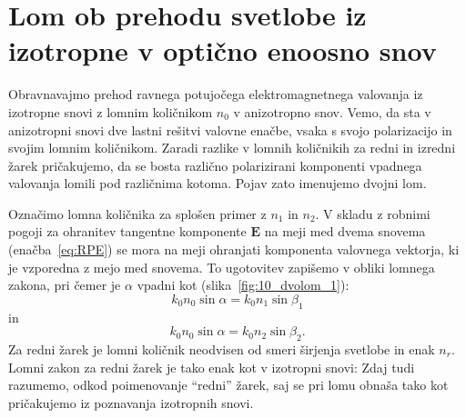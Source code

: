 \section{Lom ob prehodu svetlobe iz izotropne v optično enoosno 
snov}
Obravnavajmo prehod ravnega potujočega elektromagnetnega valovanja iz izotropne snovi 
z lomnim količnikom $n_0$ v anizotropno snov. Vemo, da sta v anizotropni snovi 
dve lastni rešitvi valovne enačbe, vsaka s svojo polarizacijo in svojim lomnim količnikom.
Zaradi razlike v lomnih količnikih za redni in izredni žarek pričakujemo,
da se bosta različno polarizirani komponenti vpadnega valovanja lomili 
pod različnima kotoma. Pojav zato imenujemo dvojni lom.

Označimo lomna količnika za splošen primer z $n_1$ in $n_2$.
V skladu z robnimi pogoji za ohranitev tangentne komponente $\mathbf{E}$ 
na meji med dvema snovema (enačba~\ref{eq:RPE}) se mora na meji ohranjati 
komponenta valovnega vektorja, ki je vzporedna z mejo med snovema.
To ugotovitev zapišemo v obliki lomnega zakona, pri čemer je $\alpha$ vpadni kot 
(slika~\ref{fig:10_dvolom_1}):
\begin{equation}
k_0 n_0 \sin \alpha = k_0 n_1 \sin \beta_1 
\label{eq:10_106a}
\end{equation}
in 
\begin{equation}
k_0 n_0 \sin \alpha = k_0 n_2 \sin \beta_2.
\label{eq:10_106}
\end{equation}
Za redni žarek je lomni količnik neodvisen od smeri širjenja svetlobe in enak $n_r$.
Lomni zakon za redni žarek je tako enak kot v izotropni snovi:
Zdaj tudi razumemo, odkod poimenovanje ``redni'' žarek, saj se pri lomu obnaša tako kot
pričakujemo iz poznavanja izotropnih snovi. 

